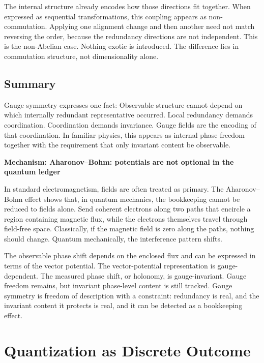 \documentclass[11pt,twoside,openright]{book}
\newenvironment{mechanismbox}[1]
  {\begin{framed}\noindent\textbf{Mechanism: #1}\par\medskip}
  {\end{framed}}
\begin{document}
The internal structure already encodes how those directions fit together. When expressed as sequential transformations, this coupling appears as non-commutation. Applying one alignment change and then another need not match reversing the order, because the redundancy directions are not independent. This is the non-Abelian case. Nothing exotic is introduced. The difference lies in commutation structure, not dimensionality alone.

\section*{Summary}

Gauge symmetry expresses one fact: Observable structure cannot depend on which internally redundant representative occurred. Local redundancy demands coordination. Coordination demands invariance. Gauge fields are the encoding of that coordination. In familiar physics, this appears as internal phase freedom together with the requirement that only invariant content be observable.

\begin{mechanismbox}{Aharonov--Bohm: potentials are not optional in the quantum ledger}

In standard electromagnetism, fields are often treated as primary. The Aharonov--Bohm effect shows that, in quantum mechanics, the bookkeeping cannot be reduced to fields alone. Send coherent electrons along two paths that encircle a region containing magnetic flux, while the electrons themselves travel through field-free space. Classically, if the magnetic field is zero along the paths, nothing should change. Quantum mechanically, the interference pattern shifts.

The observable phase shift depends on the enclosed flux and can be expressed in terms of the vector potential. The vector-potential representation is gauge-dependent. The measured phase shift, or holonomy, is gauge-invariant. Gauge freedom remains, but invariant phase-level content is still tracked. Gauge symmetry is freedom of description with a constraint: redundancy is real, and the invariant content it protects is real, and it can be detected as a bookkeeping effect.

\end{mechanismbox}
\chapter{Quantization as Discrete Outcome}
\end{document}
